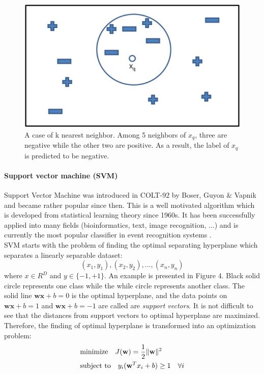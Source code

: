   \begin{figure}[!ht]
  \centering
    \includegraphics[scale=0.5]{./knn.jpg}
  \caption{A case of k nearest neighbor. Among 5 neighbors of $x_{q}$, three are negative while the other two are positive. As a result, the label of $x_{q}$ is predicted to be negative.}
  \end{figure}

  \paragraph{Support vector machine (SVM)}
  Support Vector Machine was introduced in COLT-92 by Boser, Guyon \& Vapnik \cite{boser1992training} and became rather popular since then. This is a well motivated algorithm which is developed from statistical learning theory since 1960s. It has been successfully applied into many fields (bioinformatics, text, image recognition, ...) and is currently the most popular classifier in event recognition systems \cite{jiang2012high}. \\

  \noindent SVM starts with the problem of finding the optimal separating hyperplane which separates a linearly separable dataset: $${(x_{1}, y_{1}), (x_{2}, y_{2}), ..., (x_{n}, y_{n})}$$ where $x \in R^{D}$ and $y \in  \{ -1, +1 \}$. An example is presented in Figure 4. Black solid circle represents one class while the while circle represents another class. The solid line $\mathbf{w} \mathbf{x} + b = 0$ is the optimal hyperplane, and the data points on $\mathbf{w} \mathbf{x} + b = 1$ and $\mathbf{w} \mathbf{x} + b = -1$ are called are {\em support vectors}. It is not difficult to see that the distances from support vectors to optimal hyperplane  are maximized. Therefore, the finding of optimal hyperplane is transformed into an optimization problem:
  \begin{eqnarray}
  & \text{minimize} \quad J(\mathbf{w}) = \frac{1}{2} \lVert \mathbf{w} \rVert^2 \nonumber \\
  & \text{subject to} \quad y_i (\mathbf{w}^{T} x_i + b) \ge 1 \quad \forall i
  \end{eqnarray}
  
